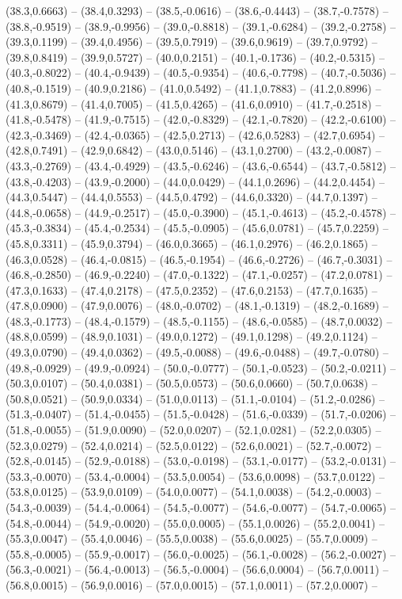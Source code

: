 \documentclass{SVnote}
\begin{document}
(38.3,0.6663) -- (38.4,0.3293) -- (38.5,-0.0616) -- (38.6,-0.4443) -- (38.7,-0.7578) -- (38.8,-0.9519) -- (38.9,-0.9956) -- (39.0,-0.8818) -- (39.1,-0.6284) -- (39.2,-0.2758) -- (39.3,0.1199) -- (39.4,0.4956) -- (39.5,0.7919) -- (39.6,0.9619) -- (39.7,0.9792) -- (39.8,0.8419) -- (39.9,0.5727) -- (40.0,0.2151) -- (40.1,-0.1736) -- (40.2,-0.5315) -- (40.3,-0.8022) -- (40.4,-0.9439) -- (40.5,-0.9354) -- (40.6,-0.7798) -- (40.7,-0.5036) -- (40.8,-0.1519) -- (40.9,0.2186) -- (41.0,0.5492) -- (41.1,0.7883) -- (41.2,0.8996) -- (41.3,0.8679) -- (41.4,0.7005) -- (41.5,0.4265) -- (41.6,0.0910) -- (41.7,-0.2518) -- (41.8,-0.5478) -- (41.9,-0.7515) -- (42.0,-0.8329) -- (42.1,-0.7820) -- (42.2,-0.6100) -- (42.3,-0.3469) -- (42.4,-0.0365) -- (42.5,0.2713) -- (42.6,0.5283) -- (42.7,0.6954) -- (42.8,0.7491) -- (42.9,0.6842) -- (43.0,0.5146) -- (43.1,0.2700) -- (43.2,-0.0087) -- (43.3,-0.2769) -- (43.4,-0.4929) -- (43.5,-0.6246) -- (43.6,-0.6544) -- (43.7,-0.5812) -- (43.8,-0.4203) -- (43.9,-0.2000) -- (44.0,0.0429) -- (44.1,0.2696) -- (44.2,0.4454) -- (44.3,0.5447) -- (44.4,0.5553) -- (44.5,0.4792) -- (44.6,0.3320) -- (44.7,0.1397) -- (44.8,-0.0658) -- (44.9,-0.2517) -- (45.0,-0.3900) -- (45.1,-0.4613) -- (45.2,-0.4578) -- (45.3,-0.3834) -- (45.4,-0.2534) -- (45.5,-0.0905) -- (45.6,0.0781) -- (45.7,0.2259) -- (45.8,0.3311) -- (45.9,0.3794) -- (46.0,0.3665) -- (46.1,0.2976) -- (46.2,0.1865) -- (46.3,0.0528) -- (46.4,-0.0815) -- (46.5,-0.1954) -- (46.6,-0.2726) -- (46.7,-0.3031) -- (46.8,-0.2850) -- (46.9,-0.2240) -- (47.0,-0.1322) -- (47.1,-0.0257) -- (47.2,0.0781) -- (47.3,0.1633) -- (47.4,0.2178) -- (47.5,0.2352) -- (47.6,0.2153) -- (47.7,0.1635) -- (47.8,0.0900) -- (47.9,0.0076) -- (48.0,-0.0702) -- (48.1,-0.1319) -- (48.2,-0.1689) -- (48.3,-0.1773) -- (48.4,-0.1579) -- (48.5,-0.1155) -- (48.6,-0.0585) -- (48.7,0.0032) -- (48.8,0.0599) -- (48.9,0.1031) -- (49.0,0.1272) -- (49.1,0.1298) -- (49.2,0.1124) -- (49.3,0.0790) -- (49.4,0.0362) -- (49.5,-0.0088) -- (49.6,-0.0488) -- (49.7,-0.0780) -- (49.8,-0.0929) -- (49.9,-0.0924) -- (50.0,-0.0777) -- (50.1,-0.0523) -- (50.2,-0.0211) -- (50.3,0.0107) -- (50.4,0.0381) -- (50.5,0.0573) -- (50.6,0.0660) -- (50.7,0.0638) -- (50.8,0.0521) -- (50.9,0.0334) -- (51.0,0.0113) -- (51.1,-0.0104) -- (51.2,-0.0286) -- (51.3,-0.0407) -- (51.4,-0.0455) -- (51.5,-0.0428) -- (51.6,-0.0339) -- (51.7,-0.0206) -- (51.8,-0.0055) -- (51.9,0.0090) -- (52.0,0.0207) -- (52.1,0.0281) -- (52.2,0.0305) -- (52.3,0.0279) -- (52.4,0.0214) -- (52.5,0.0122) -- (52.6,0.0021) -- (52.7,-0.0072) -- (52.8,-0.0145) -- (52.9,-0.0188) -- (53.0,-0.0198) -- (53.1,-0.0177) -- (53.2,-0.0131) -- (53.3,-0.0070) -- (53.4,-0.0004) -- (53.5,0.0054) -- (53.6,0.0098) -- (53.7,0.0122) -- (53.8,0.0125) -- (53.9,0.0109) -- (54.0,0.0077) -- (54.1,0.0038) -- (54.2,-0.0003) -- (54.3,-0.0039) -- (54.4,-0.0064) -- (54.5,-0.0077) -- (54.6,-0.0077) -- (54.7,-0.0065) -- (54.8,-0.0044) -- (54.9,-0.0020) -- (55.0,0.0005) -- (55.1,0.0026) -- (55.2,0.0041) -- (55.3,0.0047) -- (55.4,0.0046) -- (55.5,0.0038) -- (55.6,0.0025) -- (55.7,0.0009) -- (55.8,-0.0005) -- (55.9,-0.0017) -- (56.0,-0.0025) -- (56.1,-0.0028) -- (56.2,-0.0027) -- (56.3,-0.0021) -- (56.4,-0.0013) -- (56.5,-0.0004) -- (56.6,0.0004) -- (56.7,0.0011) -- (56.8,0.0015) -- (56.9,0.0016) -- (57.0,0.0015) -- (57.1,0.0011) -- (57.2,0.0007) -- 
\end{document}
